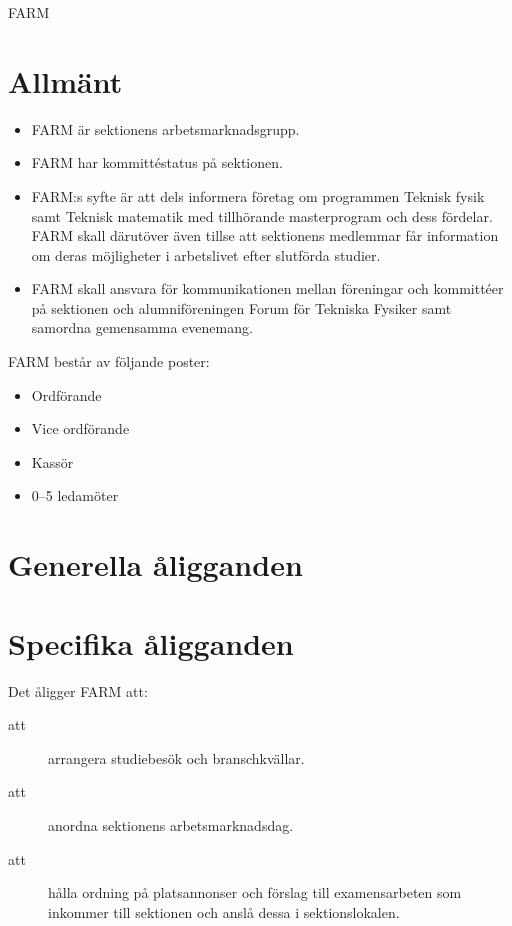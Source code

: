 \documentclass[a4paper]{article}
\begin{document}
\renewcommand{\forening}{FARM} %

\begin{foreningenv}{\forening{}} %
    \section{Allmänt}
    \begin{itemize}
        \item FARM är sektionens arbetsmarknadsgrupp. 
        \item FARM har kommittéstatus på sektionen.
        \item FARM:s syfte är att dels informera företag om programmen Teknisk fysik samt Teknisk matematik med tillhörande masterprogram och dess fördelar. FARM skall därutöver även tillse att sektionens medlemmar får information om deras möjligheter i arbetslivet efter slutförda studier.
        \item FARM skall ansvara för kommunikationen mellan föreningar och kommittéer på sektionen och alumniföreningen Forum för Tekniska Fysiker samt samordna gemensamma evenemang.
    \end{itemize}
    
    FARM består av följande poster:
    \begin{itemize}
        \item Ordförande
        \item Vice ordförande
        \item Kassör
        \item 0--5 ledamöter
    \end{itemize}
    
    \section{Generella åligganden}
    \aliggkom{}
    
    \section{Specifika åligganden}
    Det åligger FARM att:
    \begin{description}
        \item[att] arrangera studiebesök och branschkvällar.
        \item[att] anordna sektionens arbetsmarknadsdag.
        \item[att] hålla ordning på platsannonser och förslag till examensarbeten som inkommer till sektionen och anslå dessa i sektionslokalen.
    \end{description}
    

\end{foreningenv}
\end{document}
